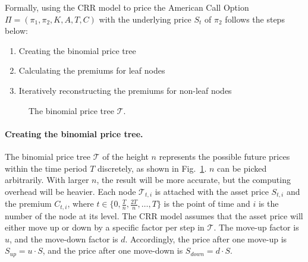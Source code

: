 Formally, using the CRR model to price the American Call Option $\Pi = (\pi_1, \pi_2, K, A, T, C)$ with the underlying price $S_t$ of $\pi_2$ follows the steps below:
\begin{enumerate}
    \item Creating the binomial price tree
    \item Calculating the premiums for leaf nodes
    \item Iteratively reconstructing the premiums for non-leaf nodes 
\end{enumerate}

\begin{figure}
\centering
{}
\caption{The binomial price tree $\mathcal{T}$.}
\label{fig:binomial_tree}
\end{figure}


\paragraph{Creating the binomial price tree.}
The binomial price tree $\mathcal{T}$ of the height $n$ represents the possible future prices within the time period $T$ discretely, as shown in Fig.~\ref{fig:binomial_tree}.
$n$ can be picked arbitrarily. With larger $n$, the result will be more accurate, but the computing overhead will be heavier.
Each node $\mathcal{T}_{t, i}$ is attached with the asset price $S_{t, i}$ and the premium $C_{t, i}$,
where $t \in \{0, \frac{T}{n}, \frac{2T}{n}, \dots, T\}$ is the point of time and $i$ is the number of the node at its level.
The CRR model assumes that the asset price will either move up or down by a specific factor per step in $\mathcal{T}$.
The move-up factor is $u$, and the move-down factor is $d$.
Accordingly, the price after one move-up is $S_{up} = u \cdot S$, and the price after one move-down is $S_{down} = d \cdot S$.

